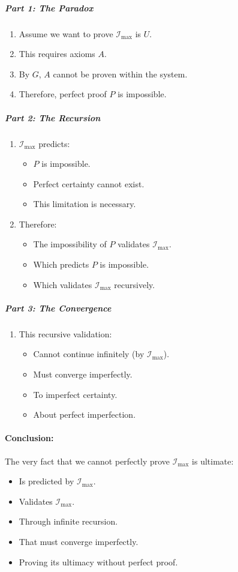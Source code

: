 \documentclass[12pt]{article}
\begin{document}
\subparagraph{Part 1: The Paradox}
\begin{enumerate}
    \item Assume we want to prove \(\mathcal{I}_{\text{max}}\) is \(U\).
    \item This requires axioms \(A\).
    \item By \(G\), \(A\) cannot be proven within the system.
    \item Therefore, perfect proof \(P\) is impossible.
\end{enumerate}

\subparagraph{Part 2: The Recursion}
\begin{enumerate}
    \item \(\mathcal{I}_{\text{max}}\) predicts:
    \begin{itemize}
        \item \(P\) is impossible.
        \item Perfect certainty cannot exist.
        \item This limitation is necessary.
    \end{itemize}
    \item Therefore:
    \begin{itemize}
        \item The impossibility of \(P\) validates \(\mathcal{I}_{\text{max}}\).
        \item Which predicts \(P\) is impossible.
        \item Which validates \(\mathcal{I}_{\text{max}}\) recursively.
    \end{itemize}
\end{enumerate}

\subparagraph{Part 3: The Convergence}
\begin{enumerate}
    \item This recursive validation:
    \begin{itemize}
        \item Cannot continue infinitely (by \(\mathcal{I}_{\text{max}}\)).
        \item Must converge imperfectly.
        \item To imperfect certainty.
        \item About perfect imperfection.
    \end{itemize}
\end{enumerate}

\paragraph{Conclusion:}
The very fact that we cannot perfectly prove \(\mathcal{I}_{\text{max}}\) is ultimate:
\begin{itemize}
    \item Is predicted by \(\mathcal{I}_{\text{max}}\).
    \item Validates \(\mathcal{I}_{\text{max}}\).
    \item Through infinite recursion.
    \item That must converge imperfectly.
    \item Proving its ultimacy without perfect proof.
\end{itemize}
\end{document}
